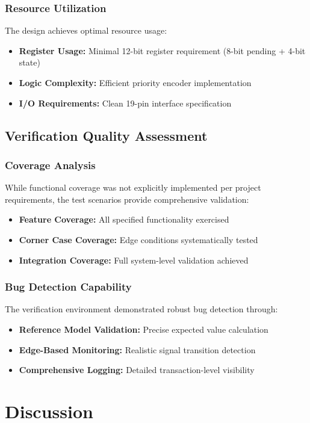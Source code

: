 \documentclass[12pt,a4paper]{article}
\begin{document}
\subsubsection{Resource Utilization}
The design achieves optimal resource usage:
\begin{itemize}
    \item \textbf{Register Usage:} Minimal 12-bit register requirement (8-bit pending + 4-bit state)
    \item \textbf{Logic Complexity:} Efficient priority encoder implementation
    \item \textbf{I/O Requirements:} Clean 19-pin interface specification
\end{itemize}

\subsection{Verification Quality Assessment}
\subsubsection{Coverage Analysis}
While functional coverage was not explicitly implemented per project requirements, the test scenarios provide comprehensive validation:
\begin{itemize}
    \item \textbf{Feature Coverage:} All specified functionality exercised
    \item \textbf{Corner Case Coverage:} Edge conditions systematically tested
    \item \textbf{Integration Coverage:} Full system-level validation achieved
\end{itemize}

\subsubsection{Bug Detection Capability}
The verification environment demonstrated robust bug detection through:
\begin{itemize}
    \item \textbf{Reference Model Validation:} Precise expected value calculation
    \item \textbf{Edge-Based Monitoring:} Realistic signal transition detection
    \item \textbf{Comprehensive Logging:} Detailed transaction-level visibility
\end{itemize}

\section{Discussion}
\end{document}
